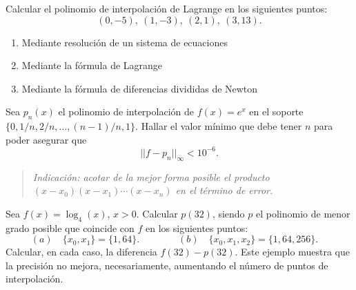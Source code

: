 \begin{EjerciciosPropuestos}
  \begin{problema}
    Calcular el polinomio de interpolación de Lagrange en los
    siguientes puntos:
    $$
    (0,-5),\ (1,-3),\ (2,1),\ (3,13).
    $$
    \begin{enumerate}
    \item Mediante resolución de un sistema de ecuaciones
    \item Mediante la fórmula de Lagrange
    \item Mediante la fórmula de diferencias divididas de Newton
    \end{enumerate}

  \end{problema}




  \begin{problema}
    Sea $p_n(x)$ el polinomio de interpolación de $f(x)=e^x$ en el
    soporte $\{0,1/n,2/n,\dots,(n-1)/n,1\}$. Hallar el valor mínimo
    que debe tener $n$ para poder asegurar que
    $$
    ||f-p_n||_\infty<10^{-6}.
    $$
    \begin{quotation}
      \small\em Indicación: acotar de la mejor forma posible el
      producto $(x-x_0)(x-x_1)\cdots(x-x_n)$ en el término de error.
    \end{quotation}
  \end{problema}

  \begin{problema}
    Sea $f(x)=\log_4(x)$, $x>0$. Calcular $p(32)$, siendo $p$ el
    polinomio de menor grado posible que coincide con $f$ en los
    siguientes puntos:
    \begin{equation*}
      (a) \quad \{x_0,x_1\}=\{1,64\}. \qquad\qquad
      (b) \quad \{x_0,x_1,x_2\}=\{1,64,256\}.
      \quad
    \end{equation*}
    Calcular, en cada caso, la diferencia $f(32)-p(32)$. Este ejemplo
    muestra que la precisión no mejora, necesariamente, aumentando el
    número de puntos de interpolación.
  \end{problema}

\end{EjerciciosPropuestos}

